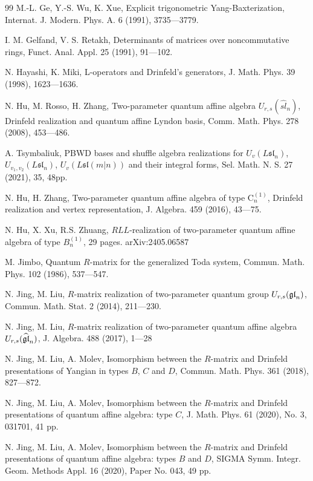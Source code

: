 \documentclass[10pt,a4paper]{amsart}
\numberwithin{equation}{section}
\begin{document}
\begin{thebibliography}{99}
	M.-L. Ge, Y.-S. Wu, K. Xue, Explicit trigonometric Yang-Baxterization, Internat. J. Modern. Phys. A. 6 (1991), 3735---3779.
	
	{I. M. Gelfand, V. S. Retakh},
	Determinants
	of matrices over noncommutative rings, {Funct. Anal. Appl.} 25
	(1991), 91---102.

	 N. Hayashi, K. Miki, L-operators and Drinfeld's generators, J. Math. Phys. 39 (1998), 1623---1636.

	N. Hu, M. Rosso, H. Zhang, Two-parameter quantum affine algebra $U_{r, s}(\widehat{s l}_n)$, Drinfeld
	realization and quantum affine Lyndon basis, Comm. Math. Phys. 278 (2008), 453---486.

 A. Tsymbaliuk, PBWD bases and shuffle algebra realizations for $U_v(L\mathfrak{sl}_n)$, $U_{v_1, v_2}(L\mathfrak{sl}_n)$,
$U_v(L\mathfrak{sl}(m|n))$ and their integral forms, Sel. Math. N. S. 27 (2021), 35, 48pp.

	
	N. Hu, H. Zhang, Two-parameter quantum affine algebra of type $\mathrm{C}_n^{(1)}$, Drinfeld realization and vertex representation, J. Algebra. 459 (2016), 43---75.
	


	 	N. Hu, X. Xu, R.S. Zhuang, $RLL$-realization of two-parameter quantum affine algebra of type $B_n^{(1)}$, 29 pages.	arXiv:2405.06587	
	
	M. Jimbo, Quantum $R$-matrix for the generalized Toda system, Commun. Math. Phys. 102 (1986), 537---547.
	
	 N. Jing, M. Liu, $R$-matrix realization of two-parameter quantum group $U_{r,s}(\frak{gl}_n)$, Commun. Math. Stat. 2 (2014), 211---230.
	
	 N. Jing, M. Liu, $R$-matrix realization of two-parameter quantum affine algebra $U_{r,s}(\widehat{\frak{gl}}_n)$, J. Algebra. 488 (2017), 1---28
		
	N. Jing, M. Liu, A. Molev, Isomorphism between the $R$-matrix and Drinfeld presentations of Yangian in types $B$, $C$ and $D$, Commun. Math. Phys. 361 (2018), 827---872.
		
	N. Jing, M. Liu, A. Molev, Isomorphism between the $R$-matrix and Drinfeld presentations of quantum affine algebra: type $C$, J. Math. Phys. 61 (2020), No. 3, 031701, 41 pp.
		
	N. Jing, M. Liu, A. Molev, Isomorphism between the $R$-matrix and Drinfeld presentations
	of quantum affine algebra: types $B$ and $D$, SIGMA Symm. Integr. Geom. Methods Appl. 16 (2020), Paper No. 043, 49 pp.
	

\end{thebibliography}
\end{document}
